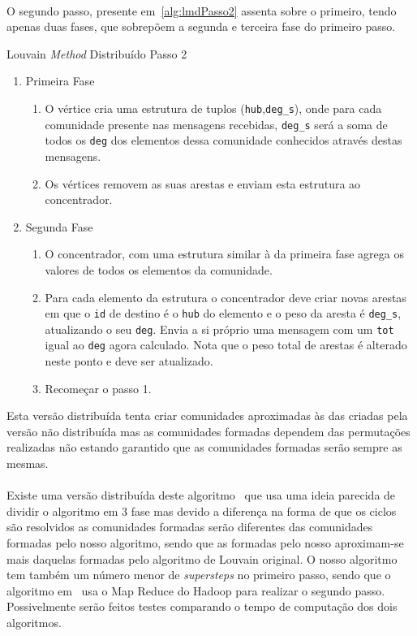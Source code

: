 \paragraph{}
O segundo passo, presente em~\ref{alg:lmdPasso2} assenta sobre o primeiro, tendo apenas duas fases, que sobrepõem a segunda e terceira fase do primeiro passo.

\begin{algorithm}
\caption{Louvain \textit{Method} Distribuído Passo 2}
\label{alg:lmdPasso2}
\begin{enumerate}
	\item Primeira Fase
	
	\begin{enumerate}
		\item O vértice cria uma estrutura de tuplos (\verb|hub|,\verb|deg_s|), onde para cada comunidade presente nas mensagens recebidas, \verb|deg_s| será a soma de todos os \verb|deg| dos elementos dessa comunidade conhecidos através destas mensagens.
		\item Os vértices removem as suas arestas e enviam esta estrutura ao concentrador.
	\end{enumerate}
	
	\item Segunda Fase
	
	
	\begin{enumerate}
		\item O concentrador, com uma estrutura similar à da primeira fase agrega os valores de todos os elementos da comunidade.
		\item Para cada elemento da estrutura o concentrador deve criar novas arestas em que o \verb|id| de destino é o \verb|hub| do elemento e o peso da aresta é \verb|deg_s|, atualizando o seu \verb|deg|. Envia a si próprio uma mensagem com um \verb|tot| igual ao \verb|deg| agora calculado. Nota que o peso total de arestas é alterado neste ponto e deve ser atualizado.
		\item Recomeçar o passo 1.
	\end{enumerate}
\end{enumerate}
\end{algorithm}

Esta versão distribuída tenta criar comunidades aproximadas às das criadas pela versão não distribuída mas as comunidades formadas dependem das permutações realizadas não estando garantido que as comunidades formadas serão sempre as mesmas.

\paragraph{}
Existe uma versão distribuída deste algoritmo~\cite{disLM} que usa uma ideia parecida de dividir o algoritmo em 3 fase mas devido a diferença na forma de que os ciclos são resolvidos as comunidades formadas serão diferentes das comunidades formadas pelo nosso algoritmo, sendo que as formadas pelo nosso aproximam-se mais daquelas formadas pelo algoritmo de Louvain original. O nosso algoritmo tem também um número menor de \textit{supersteps} no primeiro passo, sendo que o algoritmo em~\cite{disLM} usa o Map Reduce do Hadoop para realizar o segundo passo.
Possivelmente serão feitos testes comparando o tempo de computação dos dois algoritmos.

